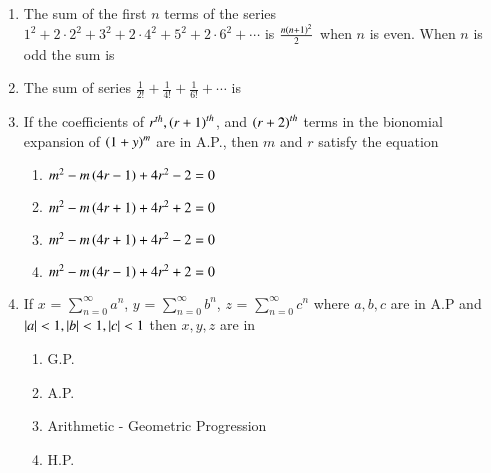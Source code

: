 \documentclass[journal]{IEEEtran}
\begin{document}
\begin{enumerate}[label={\arabic*.}]
\item {The sum of the first $n$ terms of the series $1^2+2\cdot2^2+3^2+2\cdot4^2+5^2+2\cdot6^2+\cdots$ is $\frac{n\left(n+1\right)^2}{2}$ when $n$ is even. When $n$ is odd the sum is}
{\hfill{}}
\begin{enumerate}
\end{enumerate}

\item {The sum of series $\frac{1}{2!}+\frac{1}{4!}+\frac{1}{6!}+\cdots$ is}
{\hfill{}} 
\begin{enumerate}
\end{enumerate}

\item {If the coefficients of $r^{th}, \left(r+1\right)^{th}$, and $\left(r+2\right)^{th}$ terms in the bionomial expansion of $\left(1+y\right)^m$ are in A.P., then $m$ and $r$ satisfy the equation}

{\hfill{}} 
\begin{enumerate}
\item  {$m^2-m\left(4r-1\right)+4r^2-2=0$}
\item  {$m^2-m\left(4r+1\right)+4r^2+2=0$}
\item  {$m^2-m\left(4r+1\right)+4r^2-2=0$}
\item  {$m^2-m\left(4r-1\right)+4r^2+2=0$}
\end{enumerate}

\item {If $x$ = $\sum\limits_{n=0}^{\infty}a^n$, $y$ = $\sum\limits_{n=0}^{\infty}b^n$, $z$ = $\sum\limits_{n=0}^{\infty}c^n$ where $a,b,c$ are in A.P and $\left\vert a\right\vert<1,\left\vert b\right\vert<1,\left\vert c\right\vert<1$ then $x,y,z$ are in}
{\hfill{}} 
\begin{enumerate}
\item  {G.P.}
\item  {A.P.}
\item  {Arithmetic - Geometric Progression}
\item  {H.P.}
\end{enumerate}


\end{enumerate}
\end{document}
